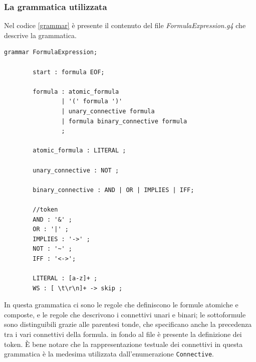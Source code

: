 \documentclass[a4paper,12pt]{report}
\begin{document}
\subsubsection{La grammatica utilizzata}

Nel codice \ref{grammar} è presente il contenuto del file \emph{FormulaExpression.g4} che descrive la grammatica.

\begin{minipage}{\linewidth}
    \begin{lstlisting}[label=grammar, caption={file FormulaExpression.g4}]
        grammar FormulaExpression;

        start : formula EOF;

        formula : atomic_formula
                | '(' formula ')' 
                | unary_connective formula
                | formula binary_connective formula
                ;

        atomic_formula : LITERAL ;

        unary_connective : NOT ;

        binary_connective : AND | OR | IMPLIES | IFF;

        //token
        AND : '&' ;
        OR : '|' ;
        IMPLIES : '->' ;
        NOT : '~' ;
        IFF : '<->';

        LITERAL : [a-z]+ ;
        WS : [ \t\r\n]+ -> skip ;
    \end{lstlisting}
\end{minipage}
In questa grammatica ci sono le regole che definiscono le formule atomiche e composte, e le regole che descrivono i connettivi unari e binari; le sottoformule sono distinguibili grazie alle parentesi tonde, che specificano anche la precedenza tra i vari connettivi della formula. in fondo al file è presente la definizione dei token. È bene notare che la rappresentazione testuale dei connettivi in questa grammatica è la medesima utilizzata dall'enumerazione \texttt{Connective}.
\end{document}

